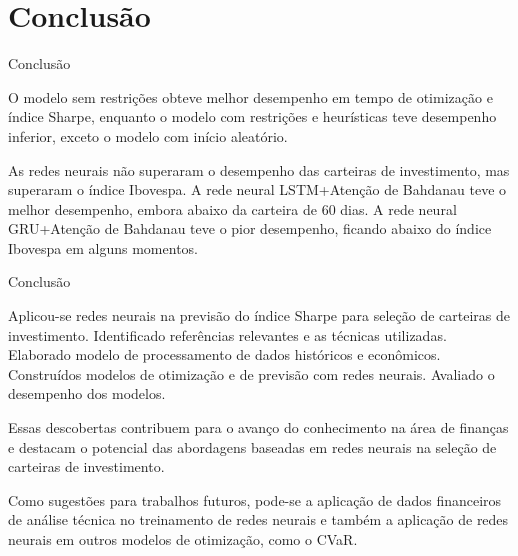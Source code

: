 \section{Conclusão}


\begin{frame}{Conclusão}

    \Large

    O modelo sem restrições obteve melhor desempenho em tempo de otimização e índice Sharpe, enquanto o modelo com restrições e heurísticas teve desempenho inferior, exceto o modelo com início aleatório.

    As redes neurais não superaram o desempenho das carteiras de investimento, mas superaram o índice Ibovespa. A rede neural LSTM+Atenção de Bahdanau teve o melhor desempenho, embora abaixo da carteira de 60 dias. A rede neural GRU+Atenção de Bahdanau teve o pior desempenho, ficando abaixo do índice Ibovespa em alguns momentos.

\end{frame}


\begin{frame}{Conclusão}

    \Large

    Aplicou-se redes neurais na previsão do índice Sharpe para seleção de carteiras de investimento. Identificado referências relevantes e as técnicas utilizadas. Elaborado modelo de processamento de dados históricos e econômicos. Construídos modelos de otimização e de previsão com redes neurais. Avaliado o desempenho dos modelos.

    Essas descobertas contribuem para o avanço do conhecimento na área de finanças e destacam o potencial das abordagens baseadas em redes neurais na seleção de carteiras de investimento.

    Como sugestões para trabalhos futuros, pode-se a aplicação de dados financeiros de análise técnica no treinamento de redes neurais e também a aplicação de redes neurais em outros modelos de otimização, como o CVaR.


\end{frame}
